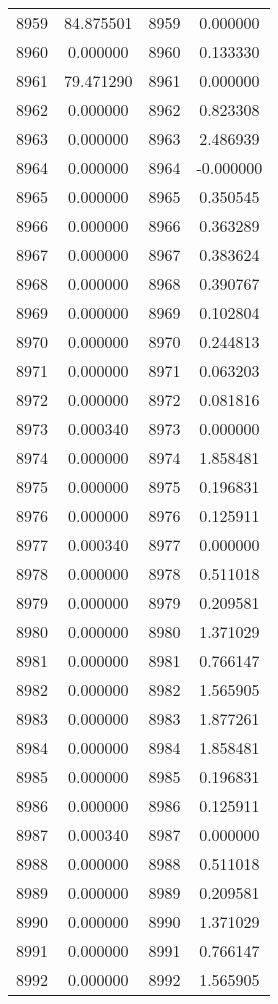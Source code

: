 \documentclass[12pt]{article}
\begin{document}
\begin{longtable}{@{}cccc@{}}
8959 & 84.875501 & 8959 & 0.000000 \\
8960 & 0.000000 & 8960 & 0.133330 \\
8961 & 79.471290 & 8961 & 0.000000 \\
8962 & 0.000000 & 8962 & 0.823308 \\
8963 & 0.000000 & 8963 & 2.486939 \\
8964 & 0.000000 & 8964 & -0.000000 \\
8965 & 0.000000 & 8965 & 0.350545 \\
8966 & 0.000000 & 8966 & 0.363289 \\
8967 & 0.000000 & 8967 & 0.383624 \\
8968 & 0.000000 & 8968 & 0.390767 \\
8969 & 0.000000 & 8969 & 0.102804 \\
8970 & 0.000000 & 8970 & 0.244813 \\
8971 & 0.000000 & 8971 & 0.063203 \\
8972 & 0.000000 & 8972 & 0.081816 \\
8973 & 0.000340 & 8973 & 0.000000 \\
8974 & 0.000000 & 8974 & 1.858481 \\
8975 & 0.000000 & 8975 & 0.196831 \\
8976 & 0.000000 & 8976 & 0.125911 \\
8977 & 0.000340 & 8977 & 0.000000 \\
8978 & 0.000000 & 8978 & 0.511018 \\
8979 & 0.000000 & 8979 & 0.209581 \\
8980 & 0.000000 & 8980 & 1.371029 \\
8981 & 0.000000 & 8981 & 0.766147 \\
8982 & 0.000000 & 8982 & 1.565905 \\
8983 & 0.000000 & 8983 & 1.877261 \\
8984 & 0.000000 & 8984 & 1.858481 \\
8985 & 0.000000 & 8985 & 0.196831 \\
8986 & 0.000000 & 8986 & 0.125911 \\
8987 & 0.000340 & 8987 & 0.000000 \\
8988 & 0.000000 & 8988 & 0.511018 \\
8989 & 0.000000 & 8989 & 0.209581 \\
8990 & 0.000000 & 8990 & 1.371029 \\
8991 & 0.000000 & 8991 & 0.766147 \\
8992 & 0.000000 & 8992 & 1.565905 \\

\end{longtable}
\end{document}
